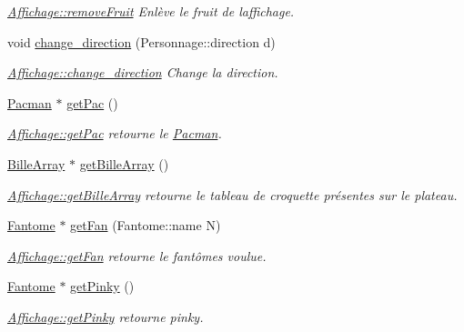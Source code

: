 \begin{DoxyCompactItemize}
\begin{DoxyCompactList}\small\item\em \hyperlink{class_affichage_acfd56bc872936e15ce091ab2b40c0772}{Affichage\+::remove\+Fruit} Enlève le fruit de l\textquotesingle{}affichage. \end{DoxyCompactList}\item 
void \hyperlink{class_affichage_a3692a1bfd597b59a5c58a4b5e8909216}{change\+\_\+direction} (Personnage\+::direction d)
\begin{DoxyCompactList}\small\item\em \hyperlink{class_affichage_a3692a1bfd597b59a5c58a4b5e8909216}{Affichage\+::change\+\_\+direction} Change la direction. \end{DoxyCompactList}\item 
\hyperlink{class_pacman}{Pacman} $\ast$ \hyperlink{class_affichage_a1adaf3913b5a9ce87ed94ff130bbbb8e}{get\+Pac} ()
\begin{DoxyCompactList}\small\item\em \hyperlink{class_affichage_a1adaf3913b5a9ce87ed94ff130bbbb8e}{Affichage\+::get\+Pac} retourne le \hyperlink{class_pacman}{Pacman}. \end{DoxyCompactList}\item 
\hyperlink{class_bille_array}{Bille\+Array} $\ast$ \hyperlink{class_affichage_a30c360baf307d459f8de8dffe05c14a4}{get\+Bille\+Array} ()
\begin{DoxyCompactList}\small\item\em \hyperlink{class_affichage_a30c360baf307d459f8de8dffe05c14a4}{Affichage\+::get\+Bille\+Array} retourne le tableau de croquette présentes sur le plateau. \end{DoxyCompactList}\item 
\hyperlink{class_fantome}{Fantome} $\ast$ \hyperlink{class_affichage_a71e7cd00ccb2e2d02f755da5a0215eb0}{get\+Fan} (Fantome\+::name N)
\begin{DoxyCompactList}\small\item\em \hyperlink{class_affichage_a71e7cd00ccb2e2d02f755da5a0215eb0}{Affichage\+::get\+Fan} retourne le fantômes voulue. \end{DoxyCompactList}\item 
\hyperlink{class_fantome}{Fantome} $\ast$ \hyperlink{class_affichage_a120bb1a313b7c3a1077f6aa12d779ed7}{get\+Pinky} ()
\begin{DoxyCompactList}\small\item\em \hyperlink{class_affichage_a120bb1a313b7c3a1077f6aa12d779ed7}{Affichage\+::get\+Pinky} retourne pinky. \end{DoxyCompactList}\item 

\end{DoxyCompactItemize}
